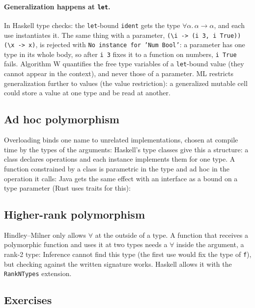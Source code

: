 \paragraph{Generalization happens at \texttt{let}.} In Haskell
type checks: the \texttt{let}-bound \texttt{ident} gets the type
$\forall \alpha.\, \alpha \to \alpha$, and each use instantiates it. The same thing with a
parameter, \lstinline|(\i -> (i 3, i True)) (\x -> x)|, is rejected with
\texttt{No instance for 'Num Bool'}: a parameter has one type in its whole
body, so after \lstinline|i 3| fixes it to a function on numbers, \lstinline|i True|
fails. Algorithm W quantifies the free type variables of a \texttt{let}-bound
value (they cannot appear in the context), and never those of a parameter.
ML restricts generalization further to values (the value restriction): a
generalized mutable cell could store a value at one type and be read at
another.

\subsection{Ad hoc polymorphism}

Overloading binds one name to unrelated implementations, chosen at compile
time by the types of the arguments:
Haskell's type classes give this a structure: a class declares operations
and each instance implements them for one type. A function constrained by a
class is parametric in the type and ad hoc in the operation it calls:
Java gets the same effect with an interface as a bound on a type parameter
(Rust uses traits for this):

\subsection{Higher-rank polymorphism}

Hindley--Milner only allows $\forall$ at the outside of a type. A function that
receives a polymorphic function and uses it at two types needs a $\forall$
inside the argument, a rank-2 type:
Inference cannot find this type (the first use would fix the type of
\texttt{f}), but checking against the written signature works. Haskell allows
it with the \texttt{RankNTypes} extension.

\subsection{Exercises}

